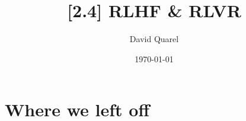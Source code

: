 \providecommand{\HANDOUT}{1}


\newcommand{\A}{\mathcal{A}}
\newcommand{\eps}{\epsilon}
\newcommand{\green}[1]{\textcolor{green!50!black}{#1}}
\newcommand{\pth}{{\boldsymbol{\phi}}}
\newcommand{\old}{\text{old}}
\newcommand{\refm}{\text{ref}}
\newcommand{\piold}{\pi_{\bth_\old}}
\newcommand{\piref}{\pi_\refm}
\newcommand{\KL}{D_{\mathrm{KL}}}
\newcommand{\lr}{u}



\title[{[2.4] RLHF \& RLVR}]
{{[2.4] RLHF \& RLVR}}

\author[David Quarel]
{David Quarel}


\date[\today]
{\today}

\frame{\titlepage}

\section{Where we left off}

